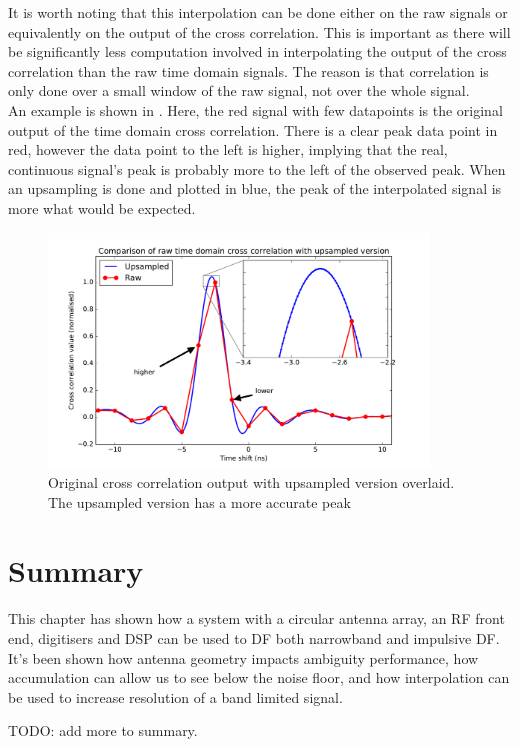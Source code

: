It is worth noting that this interpolation can be done either on the raw signals or equivalently on the output of the cross correlation. This is important as there will be significantly less computation involved in interpolating the output of the cross correlation than the raw time domain signals. The reason is that correlation is only done over a small window of the raw signal, not over the whole signal.\\

An example is shown in . Here, the red signal with few datapoints is the original output of the time domain cross correlation. There is a clear peak data point in red, however the data point to the left is higher, implying that the real, continuous signal's peak is probably more to the left of the observed peak. When an upsampling is done and plotted in blue, the peak of the interpolated signal is more what would be expected.

\begin{figure}
  \centering
  \includegraphics[width=0.9\textwidth]{time-domain-cross-raw-vs-upped}
  \caption{Original cross correlation output with upsampled version overlaid. The upsampled version has a more accurate peak}
  \label{fig:system-design-raw-vs-upsampled-timedomain}
\end{figure}

\section{Summary}
This chapter has shown how a system with a circular antenna array, an RF front end, digitisers and DSP can be used to DF both narrowband and impulsive DF. It's been shown how antenna geometry impacts ambiguity performance, how accumulation can allow us to see below the noise floor, and how interpolation can be used to increase resolution of a band limited signal.

TODO: add more to summary.
